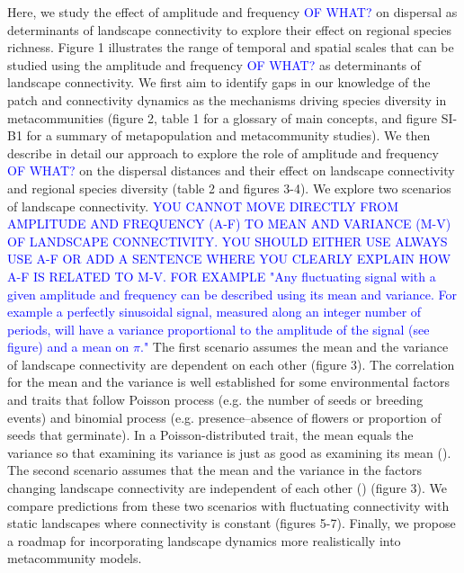 \documentclass[12pt]{article}
\newcommand{\GM}[1]{\textcolor{Blue}{#1}}
\begin{document}
Here, we study the effect of amplitude and frequency \GM{OF WHAT?} on dispersal as determinants of landscape connectivity to explore their effect on regional species richness. Figure 1 illustrates the range of temporal and spatial scales that can be studied using the amplitude and frequency \GM{OF WHAT?} as determinants of landscape connectivity. We first aim to identify gaps in our knowledge of the patch and connectivity dynamics as the mechanisms driving species diversity in metacommunities (figure 2, table 1 for a glossary of main concepts, and figure SI-B1 for a summary of metapopulation and metacommunity studies). We then describe in detail our approach to explore the role of amplitude and frequency \GM{OF WHAT?} on the dispersal distances and their effect on landscape connectivity and regional species diversity (table 2 and figures 3-4). We explore two scenarios of landscape connectivity. \GM{YOU CANNOT MOVE DIRECTLY FROM AMPLITUDE AND FREQUENCY (A-F) TO MEAN AND VARIANCE (M-V) OF LANDSCAPE CONNECTIVITY. YOU SHOULD EITHER USE ALWAYS USE A-F OR ADD A SENTENCE WHERE YOU CLEARLY EXPLAIN HOW A-F IS RELATED TO M-V. FOR EXAMPLE "Any fluctuating signal with a given amplitude and frequency can be described using its mean and variance. For example a perfectly sinusoidal signal, measured along an integer number of periods, will have a variance proportional to the amplitude of the signal (see figure) and a mean on $\pi$."} The first scenario assumes the mean and the variance of landscape connectivity are dependent on each other (figure 3). The correlation for the mean and the variance is well established for some environmental factors and traits that follow Poisson process (e.g. the number of seeds or breeding events) and binomial process (e.g. presence--absence of flowers or proportion of seeds that germinate). In a Poisson-distributed trait, the mean equals the variance so that examining its variance is just as good as examining its mean (\cite{Nakagawal&Schielzeth2012}). The second scenario assumes that the mean and the variance in the factors changing landscape connectivity are independent of each other (\cite{Violletal2012}) (figure 3). We compare predictions from these two scenarios with fluctuating connectivity with static landscapes where connectivity is constant (figures 5-7). Finally, we propose a roadmap for incorporating landscape dynamics more realistically into metacommunity models.
\end{document}
